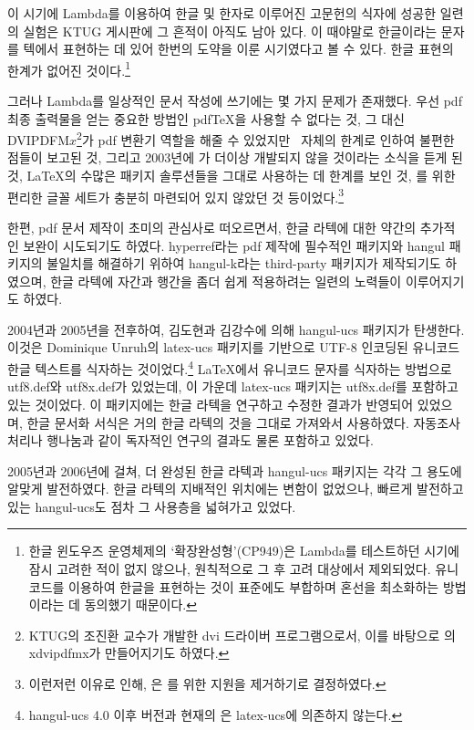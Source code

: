 이 시기에 Lambda를 이용하여 한글 및 한자로 이루어진 고문헌의 식자에
성공한 일련의 실험은 KTUG 게시판에 그 흔적이 아직도 남아 있다.
이 때야말로 한글이라는 문자를 텍에서 표현하는 데 있어 한번의 도약을
이룬 시기였다고 볼 수 있다. 한글 표현의 한계가 없어진 것이다.\footnote{%
  한글 윈도우즈 운영체제의 `확장완성형'(CP949)은 Lambda를 테스트하던
  시기에 잠시 고려한 적이 없지 않으나, 원칙적으로 그 후 고려 대상에서
  제외되었다. 유니코드를 이용하여 한글을 표현하는 것이 표준에도
  부합하며 혼선을 최소화하는 방법이라는 데 동의했기 때문이다.}

그러나 Lambda를 일상적인 문서 작성에 쓰기에는 몇 가지 문제가 존재했다.
우선 pdf 최종 출력물을 얻는 중요한 방법인 pdf\TeX 을 사용할 수 없다는
것, 그 대신 DVIPDFM$x$\footnote{KTUG의 조진환 교수가 개발한 dvi 드라이버
  프로그램으로서, 이를 바탕으로 \XeTeX 의 xdvipdfmx가 만들어지기도
  하였다.}가 pdf 변환기 역할을 해줄 수 있었지만 \OMEGA\ 자체의
한계로 인하여 불편한 점들이 보고된 것, 그리고 2003년에 \OMEGA 가
더이상 개발되지 않을 것이라는 소식을 듣게 된 것, \LaTeX 의 수많은
패키지 솔루션들을 그대로 사용하는 데 한계를 보인 것, \OMEGA 를 위한
편리한 글꼴 세트가 충분히 마련되어 있지 않았던 것 등이었다.\footnote{%
  이런저런 이유로 인해, \kotex 은 \OMEGA 를 위한 지원을
  제거하기로 결정하였다.}

한편, pdf 문서 제작이 초미의 관심사로 떠오르면서, 한글 라텍에 대한
약간의 추가적인 보완이 시도되기도 하였다. hyperref라는 pdf 제작에
필수적인 패키지와 hangul 패키지의 불일치를 해결하기 위하여 hangul-k라는
third-party 패키지가 제작되기도 하였으며, 한글 라텍에 자간과 행간을
좀더 쉽게 적용하려는 일련의 노력들이 이루어지기도 하였다. 

2004년과 2005년을 전후하여, 김도현과 김강수에 의해 hangul-ucs 패키지가
탄생한다. 이것은 Dominique Unruh의 latex-ucs 패키지를 기반으로
UTF-8 인코딩된 유니코드 한글 텍스트를 식자하는 것이었다.\footnote{%
  hangul-ucs 4.0 이후 버전과 현재의 \kotex 은 latex-ucs에
  의존하지 않는다.}
\LaTeX 에서
유니코드 문자를 식자하는 방법으로 utf8.def와 utf8x.def가 있었는데,
이 가운데 latex-ucs 패키지는 utf8x.def를 포함하고 있는 것이었다.
이 패키지에는 한글 라텍을 연구하고 수정한 결과가 반영되어 있었으며,
한글 문서화 서식은 거의 한글 라텍의 것을 그대로 가져와서 사용하였다. 
자동조사 처리나 행나눔과 같이 독자적인 연구의 결과도 물론 포함하고
있었다.

2005년과 2006년에 걸쳐, 더 완성된 한글 라텍과 hangul-ucs 패키지는
각각 그 용도에 알맞게 발전하였다. 한글 라텍의 지배적인 위치에는 변함이
없었으나, 빠르게 발전하고 있는 hangul-ucs도 점차 그 사용층을
넓혀가고 있었다.


